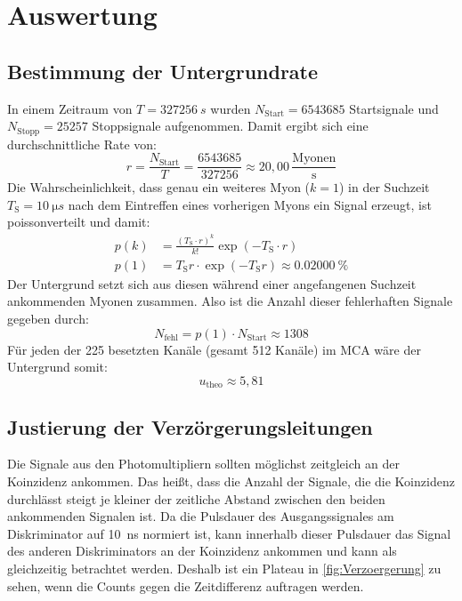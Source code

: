 \section{Auswertung}
    \subsection{Bestimmung der Untergrundrate}
    \label{sec:untergrund}
        In einem Zeitraum von $T = \SI{327256}{s}$ wurden $N_{\text{Start}} = 6543685$ Startsignale und $N_{\text{Stopp}} = 25257$
        Stoppsignale aufgenommen. Damit ergibt sich eine durchschnittliche Rate von:
        \begin{equation*}
            r = \frac{N_{\text{Start}}}{T} = \frac{6543685}{327256} \approx 20,00 \, \frac{\text{Myonen}}{\text{s}}
        \end{equation*}
        Die Wahrscheinlichkeit, dass genau ein weiteres Myon ($k = 1$) in der Suchzeit $T_\text{S} = \SI{10}{\micro s}$ nach dem Eintreffen eines vorherigen Myons ein Signal erzeugt, ist poissonverteilt und damit:
        \begin{align*}
            p(k) &= \frac{(T_{\text{S}} \cdot r)^k}{k!} \exp\left(-T_{\text{S}} \cdot r\right) \\[10pt]
            p(1) &= T_{\text{S}} r \cdot \exp\left(-T_{\text{S}}  r\right) \approx \SI{0,02000}{\%}
        \end{align*}
        Der Untergrund setzt sich aus diesen während einer angefangenen Suchzeit ankommenden Myonen zusammen. Also ist die Anzahl dieser fehlerhaften Signale gegeben durch:
        \begin{equation*}
            N_{\text{fehl}} = p(1) \cdot N_{\text{Start}} \approx 1308
        \end{equation*}
        Für jeden der 225 besetzten Kanäle (gesamt 512 Kanäle) im MCA wäre der Untergrund somit:
        \begin{equation*}
            u_{\text{theo}} \approx 5,81
        \end{equation*}

    \subsection{Justierung der Verzörgerungsleitungen}
        Die Signale aus den Photomultipliern sollten möglichst zeitgleich an der Koinzidenz ankommen. Das heißt, dass die Anzahl der Signale, die die Koinzidenz durchlässt steigt je kleiner der zeitliche Abstand zwischen den beiden ankommenden Signalen ist. 
        Da die Pulsdauer des Ausgangssignales am Diskriminator auf \SI{10}{\nano \second} normiert ist, kann innerhalb dieser Pulsdauer das Signal des anderen Diskriminators an der Koinzidenz ankommen und kann als gleichzeitig betrachtet werden.
        Deshalb ist ein Plateau in \autoref{fig:Verzoergerung} zu sehen, wenn die Counts gegen die Zeitdifferenz auftragen werden.
        
